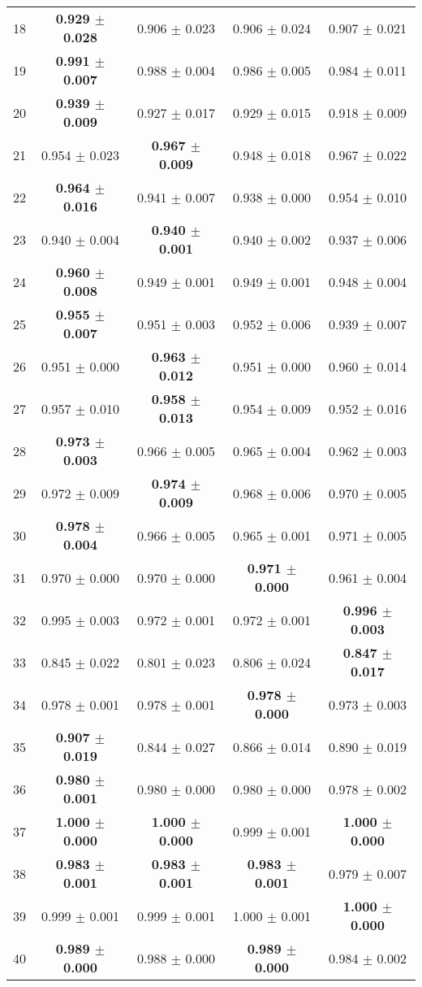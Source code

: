 \begin{table}[!ht]
{\begin{tabular}{r c c c c}
18 & \textbf{0.929 $\pm$ 0.028} & 0.906 $\pm$ 0.023 & 0.906 $\pm$ 0.024 & 0.907 $\pm$ 0.021 \\
19 & \textbf{0.991 $\pm$ 0.007} & 0.988 $\pm$ 0.004 & 0.986 $\pm$ 0.005 & 0.984 $\pm$ 0.011 \\
20 & \textbf{0.939 $\pm$ 0.009} & 0.927 $\pm$ 0.017 & 0.929 $\pm$ 0.015 & 0.918 $\pm$ 0.009 \\
21 & 0.954 $\pm$ 0.023 & \textbf{0.967 $\pm$ 0.009} & 0.948 $\pm$ 0.018 & 0.967 $\pm$ 0.022 \\
22 & \textbf{0.964 $\pm$ 0.016} & 0.941 $\pm$ 0.007 & 0.938 $\pm$ 0.000 & 0.954 $\pm$ 0.010 \\
23 & 0.940 $\pm$ 0.004 & \textbf{0.940 $\pm$ 0.001} & 0.940 $\pm$ 0.002 & 0.937 $\pm$ 0.006 \\
24 & \textbf{0.960 $\pm$ 0.008} & 0.949 $\pm$ 0.001 & 0.949 $\pm$ 0.001 & 0.948 $\pm$ 0.004 \\
25 & \textbf{0.955 $\pm$ 0.007} & 0.951 $\pm$ 0.003 & 0.952 $\pm$ 0.006 & 0.939 $\pm$ 0.007 \\
26 & 0.951 $\pm$ 0.000 & \textbf{0.963 $\pm$ 0.012} & 0.951 $\pm$ 0.000 & 0.960 $\pm$ 0.014 \\
27 & 0.957 $\pm$ 0.010 & \textbf{0.958 $\pm$ 0.013} & 0.954 $\pm$ 0.009 & 0.952 $\pm$ 0.016 \\
28 & \textbf{0.973 $\pm$ 0.003} & 0.966 $\pm$ 0.005 & 0.965 $\pm$ 0.004 & 0.962 $\pm$ 0.003 \\
29 & 0.972 $\pm$ 0.009 & \textbf{0.974 $\pm$ 0.009} & 0.968 $\pm$ 0.006 & 0.970 $\pm$ 0.005 \\
30 & \textbf{0.978 $\pm$ 0.004} & 0.966 $\pm$ 0.005 & 0.965 $\pm$ 0.001 & 0.971 $\pm$ 0.005 \\
31 & 0.970 $\pm$ 0.000 & 0.970 $\pm$ 0.000 & \textbf{0.971 $\pm$ 0.000} & 0.961 $\pm$ 0.004 \\
32 & 0.995 $\pm$ 0.003 & 0.972 $\pm$ 0.001 & 0.972 $\pm$ 0.001 & \textbf{0.996 $\pm$ 0.003} \\
33 & 0.845 $\pm$ 0.022 & 0.801 $\pm$ 0.023 & 0.806 $\pm$ 0.024 & \textbf{0.847 $\pm$ 0.017} \\
34 & 0.978 $\pm$ 0.001 & 0.978 $\pm$ 0.001 & \textbf{0.978 $\pm$ 0.000} & 0.973 $\pm$ 0.003 \\
35 & \textbf{0.907 $\pm$ 0.019} & 0.844 $\pm$ 0.027 & 0.866 $\pm$ 0.014 & 0.890 $\pm$ 0.019 \\
36 & \textbf{0.980 $\pm$ 0.001} & 0.980 $\pm$ 0.000 & 0.980 $\pm$ 0.000 & 0.978 $\pm$ 0.002 \\
37 & \textbf{1.000 $\pm$ 0.000} & \textbf{1.000 $\pm$ 0.000} & 0.999 $\pm$ 0.001 & \textbf{1.000 $\pm$ 0.000} \\
38 & \textbf{0.983 $\pm$ 0.001} & \textbf{0.983 $\pm$ 0.001} & \textbf{0.983 $\pm$ 0.001} & 0.979 $\pm$ 0.007 \\
39 & 0.999 $\pm$ 0.001 & 0.999 $\pm$ 0.001 & 1.000 $\pm$ 0.001 & \textbf{1.000 $\pm$ 0.000} \\
40 & \textbf{0.989 $\pm$ 0.000} & 0.988 $\pm$ 0.000 & \textbf{0.989 $\pm$ 0.000} & 0.984 $\pm$ 0.002 \\
\end{tabular}}
\end{table}
